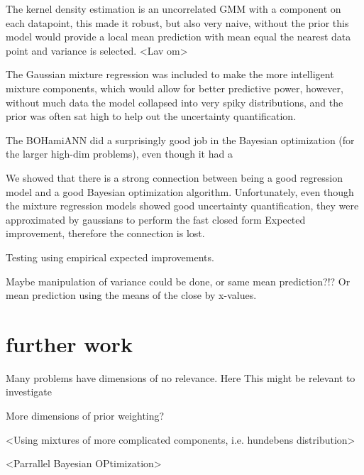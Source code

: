 The kernel density estimation is an uncorrelated GMM with a component on each datapoint, this made
it robust, but also very naive, without the prior this model would provide a local mean prediction
with mean equal the nearest data point and variance is selected. <Lav om>

The Gaussian mixture regression was included to make the more intelligent mixture components, which
would allow for better predictive power, however, without much data the model collapsed into very
spiky distributions, and the prior was often sat high to help out the uncertainty quantification. 

The BOHamiANN did a surprisingly good job in the Bayesian optimization (for the larger high-dim problems),
even though it had a 

We showed that there is a strong connection between being a good regression model and a good Bayesian optimization
algorithm. Unfortunately, even though the mixture regression models showed good uncertainty quantification,
they were approximated by gaussians to perform the fast closed form Expected improvement, therefore the 
connection is lost. 

Testing using empirical expected improvements. 

Maybe manipulation of variance could be done, or same mean prediction?!? Or 
mean prediction using the means of the close by x-values. 

\section{further work}
Many problems have dimensions of no relevance. Here This might be relevant to investigate

More dimensions of prior weighting?

<Using mixtures of more complicated components, i.e. hundebens distribution>
 
<Parrallel Bayesian OPtimization>

